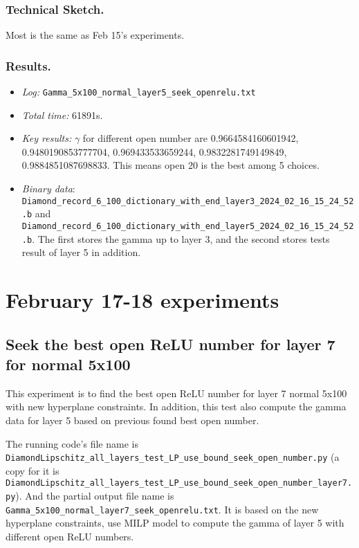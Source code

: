 \documentclass{llncs}
\begin{document}
\subsubsection*{Technical Sketch.}

Most is the same as Feb 15's experiments.

\subsubsection*{Results.}

\begin{itemize}
	\item \emph{Log:} \verb*|Gamma_5x100_normal_layer5_seek_openrelu.txt|
	
	\item \emph{Total time:} 61891s.
	
	\item \emph{Key results:} $\gamma$ for different open number are 0.9664584160601942,
	0.9480190853777704,
	0.969433533659244,
	0.9832281749149849,
	0.9884851087698833. This means open 20 is the best among 5 choices.
	
	\item \emph{Binary data}: \verb*|Diamond_record_6_100_dictionary_with_end_layer3_2024_02_16_15_24_52.b| and \verb*|Diamond_record_6_100_dictionary_with_end_layer5_2024_02_16_15_24_52.b|. The first stores the gamma up to layer 3, and the second stores tests result of layer 5 in addition.
\end{itemize}


 



\section{February 17-18 experiments}



\subsection{Seek the best open ReLU number for layer 7 for normal 5x100}

This experiment is to find the best open ReLU number for layer 7 normal 5x100 with new hyperplane constraints. In addition, this test also compute the gamma data for layer 5 based on previous found best open number.

\vspace*{1ex}

The running code's file name is \verb*|DiamondLipschitz_all_layers_test_LP_use_bound_seek_open_number.py| (a copy for it is \verb*|DiamondLipschitz_all_layers_test_LP_use_bound_seek_open_number_layer7.py|). And the partial output file name is \verb*|Gamma_5x100_normal_layer7_seek_openrelu.txt|.  It is based on the new hyperplane constraints, use MILP model to compute the gamma of layer 5 with different open ReLU numbers.
\end{document}
